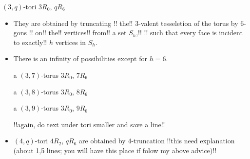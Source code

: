 \documentclass[%
pdf,
colorBG,
slideColor,
]{prosper}
\begin{document}
\begin{slide}{$(3,q)$-tori $3R_0$, $qR_6$}
\begin{itemize}
\item They are obtained by truncating 
!!%
the!! $3$-valent tesseletion of the torus by $6$-gons 
!!%
on!! the!! vertices!! from!! a set $S_h$,!! 
!!%
such that every face is incident to exactly!! $h$ vertices in $S_h$. 
\item There is an infinity of possibilities except for $h=6$.
\begin{center}
\begin{minipage}{3.5cm}
\centering
{}\par
a $(3,7)$-torus $3R_0$, $7R_6$
\end{minipage}
\begin{minipage}{3.5cm}
\centering
{}\par
a $(3,8)$-torus $3R_0$, $8R_6$
\end{minipage}
\begin{minipage}{3.5cm}
\centering
{}\par
a $(3,9)$-torus $3R_0$, $9R_6$
\end{minipage}
!!again, do text under tori smaller and save a line!!
\end{center}
\item $(4,q)$-tori $4R_2$, $qR_6$ are obtained by 
$4$-truncation
!!this need explanation (about 1,5 lines; you will have this place if 
folow my above advice)!!


\end{itemize}
\end{slide}
\end{document}
